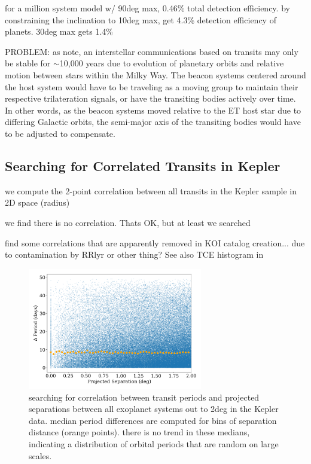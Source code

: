 \documentclass[twocolumn]{aastex62}
\begin{document}
for a million system model w/ 90deg max, 0.46\% total detection efficiency. 
by constraining the inclination to 10deg max, get 4.3\% detection efficiency of planets. 30deg max gets 1.4\%


PROBLEM:
as \citet{forgan2017} note, an interstellar communications based on transits may only be stable for $\sim$10,000 years due to evolution of planetary orbits and relative motion between stars within the Milky Way. The beacon systems centered around the host system would have to be traveling as a moving group to maintain their respective trilateration signals, or have the transiting bodies actively over time. In other words, as the beacon systems moved relative to the ET host star due to differing Galactic orbits, the semi-major axis of the transiting bodies would have to be adjusted to compensate.



\subsection{Searching for Correlated Transits in Kepler}
we compute the 2-point correlation between all transits in the Kepler sample in 2D space (radius)

we find there is no correlation. Thats OK, but at least we searched

\citet{coughlin2014} find some correlations that are apparently removed in KOI catalog creation... due to contamination by RRlyr or other thing?
See also TCE histogram in \citet{twicken2016}



\begin{figure}[]
\centering
\includegraphics[width=3in]{../figures/delta_per.png}
\caption{searching for correlation between transit periods and projected separations between all exoplanet systems out to 2deg in the Kepler data. 
median period differences are computed for bins of separation distance (orange points).
there is no trend in these medians, indicating a distribution of orbital periods that are random on large scales.}
\label{fig:2dcor}
\end{figure}
\end{document}
